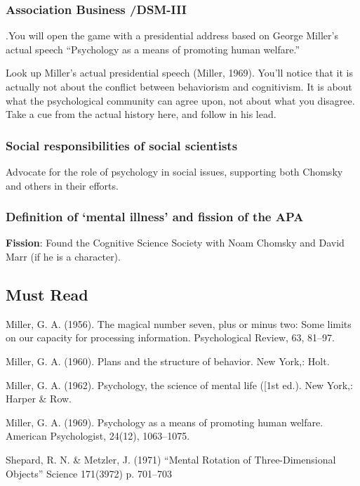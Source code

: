 \begin{refsection}
\subsubsection{Association Business \slash  DSM-III}
\label{associationbusinessdsm-iii}

\begin{writingtask}[Miller]\label{writingtask:miller}
.You will open the game with a presidential address based on George Miller's actual speech “Psychology as a means of promoting human welfare.”
\end{writingtask}Look up Miller’s actual presidential speech (Miller, 1969). You’ll notice that it is actually not about the conflict between behaviorism and cognitivism. It is about what the psychological community can agree upon, not about what you disagree. Take a cue from the actual history here, and follow in his lead.

\subsubsection{Social responsibilities of social scientists}
\label{socialresponsibilitiesofsocialscientists}

Advocate for the role of psychology in social issues, supporting both Chomsky and others in their efforts.

\subsubsection{Definition of ‘mental illness’ and fission of the APA}
\label{definitionof‘mentalillness’andfissionoftheapa}

\textbf{Fission}: Found the Cognitive Science Society with Noam Chomsky and David Marr (if he is a character).

\subsection{Must Read}
\label{mustread}

Miller, G. A. (1956). The magical number seven, plus or minus two: Some limits on our capacity for processing information. Psychological Review, 63, 81--97.

Miller, G. A. (1960). Plans and the structure of behavior. New York,: Holt.

Miller, G. A. (1962). Psychology, the science of mental life ([1st ed.). New York,: Harper \& Row.

Miller, G. A. (1969). Psychology as a means of promoting human welfare. American Psychologist, 24(12), 1063--1075.

Shepard, R. N. \& Metzler, J. (1971) “Mental Rotation of Three-Dimensional Objects” Science 171(3972) p. 701--703


\end{refsection}
\stopcontents[rolesheets]

